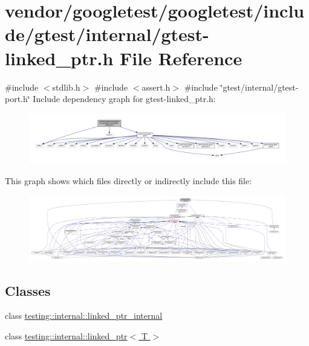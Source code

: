 \hypertarget{gtest-linked__ptr_8h}{}\section{vendor/googletest/googletest/include/gtest/internal/gtest-\/linked\+\_\+ptr.h File Reference}
\label{gtest-linked__ptr_8h}
{\ttfamily \#include $<$stdlib.\+h$>$}\newline
{\ttfamily \#include $<$assert.\+h$>$}\newline
{\ttfamily \#include \char`\"{}gtest/internal/gtest-\/port.\+h\char`\"{}}\newline
Include dependency graph for gtest-\/linked\+\_\+ptr.h\+:
\nopagebreak
\begin{figure}[H]
\begin{center}
\leavevmode
\includegraphics[width=350pt]{gtest-linked__ptr_8h__incl}
\end{center}
\end{figure}
This graph shows which files directly or indirectly include this file\+:
\nopagebreak
\begin{figure}[H]
\begin{center}
\leavevmode
\includegraphics[width=350pt]{gtest-linked__ptr_8h__dep__incl}
\end{center}
\end{figure}
\subsection*{Classes}
\begin{DoxyCompactItemize}
\item 
class \hyperlink{classtesting_1_1internal_1_1linked__ptr__internal}{testing\+::internal\+::linked\+\_\+ptr\+\_\+internal}
\item 
class \hyperlink{classtesting_1_1internal_1_1linked__ptr}{testing\+::internal\+::linked\+\_\+ptr$<$ T $>$}
\end{DoxyCompactItemize}
